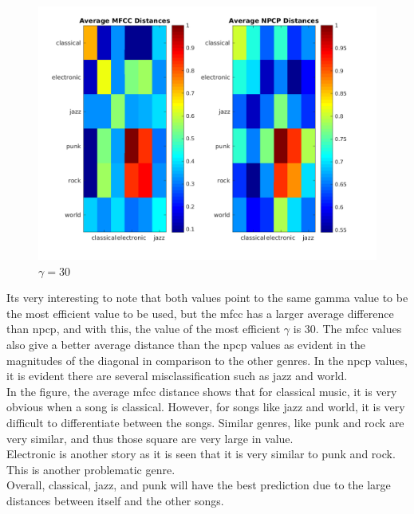 \documentclass[11pt, a4paper]{article}
\begin{document}
\begin{figure}[H]
\hspace*{-2cm}    
    \centering
    \includegraphics[width=1.25\textwidth]{average30.png}
    \caption{$\gamma = 30$}
\end{figure}

Its very interesting to note that both values point to the same gamma value to be the most efficient value to be used, but the mfcc has a larger average difference than npcp, and with this, the value of the most efficient $\gamma$ is 30. The mfcc values also give a better average distance than the npcp values as evident in the magnitudes of the diagonal in comparison to the other genres. In the npcp values, it is evident there are several misclassification such as jazz and world. \\

In the figure, the average mfcc distance shows that for classical music, it is very obvious when a song is classical. However, for songs like jazz and world, it is very difficult to differentiate between the songs. Similar genres, like punk and rock are very similar, and thus those square are very large in value.\\

Electronic is another story as it is seen that it is very similar to punk and rock. This is another problematic genre. \\

Overall, classical, jazz, and punk will have the best prediction due to the large distances between itself and the other songs. \\
\end{document}
